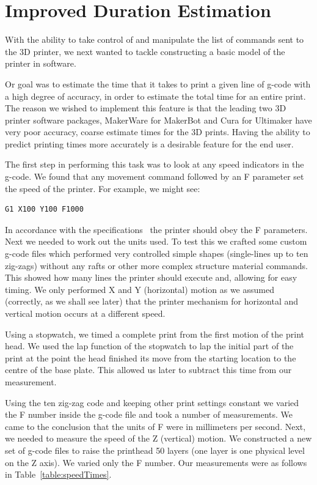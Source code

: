 \documentclass[pdftex, 11pt]{report} %
\begin{document}
\section{Improved Duration Estimation}
	With the ability to take control of and manipulate the list of commands sent to the 3D printer, we next wanted to tackle constructing a basic model of the printer in software.

	Or goal was to estimate the time that it takes to print a given line of g-code with a high degree of accuracy, in order to estimate the total time for an entire print. The reason we wished to implement this feature is that the leading two 3D printer software packages, MakerWare for MakerBot and Cura for Ultimaker have very poor accuracy, coarse estimate times for the 3D prints. Having the ability to predict printing times more accurately is a desirable feature for the end user.

	The first step in performing this task was to look at any speed indicators in the g-code. We found that any movement command followed by an F parameter set the speed of the printer. For example, we might see:
\begin{verbatim}
G1 X100 Y100 F1000
\end{verbatim}

In accordance with the specifications~\cite{RepRap2007} the printer should obey the F parameters. Next we needed to work out the units used. To test this we crafted some custom g-code files which performed very controlled simple shapes (single-lines up to ten zig-zags) without any rafts or other more complex structure material commands. This showed how many lines the printer should execute and, allowing for easy timing. We only performed X and Y (horizontal) motion as we assumed (correctly, as we shall see later) that the printer mechanism for horizontal and vertical motion occurs at a different speed.

	Using a stopwatch, we timed a complete print from the first motion of the print head. We used the lap function of the stopwatch to lap the initial part of the print at the point the head finished its move from the starting location to the centre of the base plate. This allowed us later to subtract this time from our measurement.

	Using the ten zig-zag code and keeping other print settings constant we varied the F number inside the g-code file and took a number of measurements. We came to the conclusion that the units of F were in millimeters per second. Next, we needed to measure the speed of the Z (vertical) motion. We constructed a new set of g-code files to raise the printhead 50 layers (one layer is one physical level on the Z axis). We varied only the F number. Our measurements were as follows in Table~\ref{table:speedTimes}.
\end{document}
